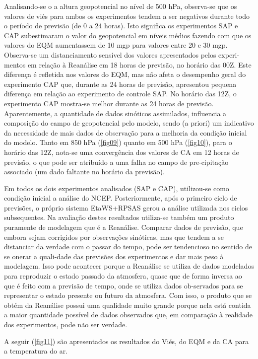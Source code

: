 Analisando-se o a altura geopotencial no nível de 500 hPa, observa-se que os valores de viés para ambos os experimentos tendem a ser negativos durante todo o período de previsão (de 0 a 24 horas). Isto significa os experimentos SAP e CAP subestimaram o valor do geopotencial em níveis médios fazendo com que os valores do EQM aumentassem de 10 mgp para valores entre 20 e 30 mgp. Observa-se um distanciamento sensível dos valores apresentados pelos experi-mentos em relação à Reanálise em 18 horas de previsão, no horário das 00Z. Este diferença é refletida nos valores do EQM, mas não afeta o desempenho geral do experimento CAP que, durante as 24 horas de previsão, apresentou pequena diferença em relação ao experimento de controle SAP. No horário das 12Z, o experimento CAP mostra-se melhor durante as 24 horas de previsão. Aparentemente, a quantidade de dados sinóticos assimilados, influencia a composição do campo de geopotencial pelo modelo, sendo (a priori) um indicativo da necessidade de mais dados de observação para a melhoria da condição inicial do modelo. Tanto em 850 hPa (\autoref{fig09}) quanto em 500 hPa (\autoref{fig10}), para o horário das 12Z, nota-se uma convergência dos valores de CA em 12 horas de previsão, o que pode ser atribuído a uma falha no campo de pre-cipitação associado (um dado faltante no horário da previsão).

Em todos os dois experimentos analisados (SAP e CAP), utilizou-se como condição inicial a análise do NCEP. Posteriormente, após o primeiro ciclo de previsões, o próprio sistema EtaWS+RPSAS gerou a análise utilizada nos ciclos subsequentes. Na avaliação destes resultados utiliza-se também um produto puramente de modelagem que é a Reanálise. Comparar dados de previsão, que embora sejam corrigidos por observações sinóticas, mas que tendem a se distanciar da verdade com o passar do tempo, pode ser tendencioso no sentido de se onerar a quali-dade das previsões dos experimentos e dar mais peso à modelagem. Isso pode acontecer porque a Reanálise se utiliza de dados modelados para reproduzir o estado passado da atmosfera, quase que de forma inversa ao que é feito com a previsão de tempo, onde se utiliza dados ob-servados para se representar o estado presente ou futuro da atmosfera. Com isso, o produto que se obtém da Reanálise possui uma qualidade muito grande porque nela está contida a maior quantidade possível de dados observados que, em comparação à realidade dos experimentos, pode não ser verdade.

A seguir (\autoref{fig11}) são apresentados os resultados do Viés, do EQM e da CA para a temperatura do ar.

